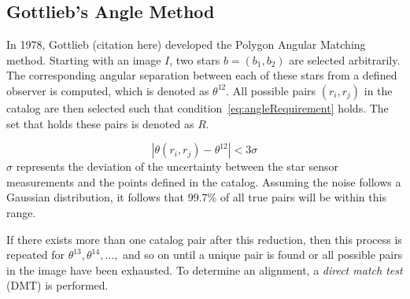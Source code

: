 
\subsection{Gottlieb's Angle Method}\label{subsec:gottlieb'sAngleMethod}
In 1978, Gottlieb (citation here) developed the Polygon Angular Matching method.
Starting with an image $I$, two stars $b = (b_1, b_2)$ are selected arbitrarily.
The corresponding angular separation between each of these stars from a defined observer is computed, which is
denoted as $\theta^{12}$.
All possible pairs $(r_i, r_j)$ in the catalog are then selected such that condition~\eqref{eq:angleRequirement} holds.
The set that holds these pairs is denoted as $R$.

\begin{equation}
    \label{eq:angleRequirement}
    | \theta(r_i, r_j) - \theta^{12} | < 3 \sigma
\end{equation}
$\sigma$ represents the deviation of the uncertainty between the star sensor measurements and the points defined in the
catalog.
Assuming the noise follows a Gaussian distribution, it follows that 99.7\% of all true pairs will be within this range.

If there exists more than one catalog pair after this reduction, then this process is repeated for
$\theta^{13}, \theta^{14}, \dots,$ and so on until a unique pair is found or all possible pairs in the image
have been exhausted.
To determine an alignment, a \textit{direct match test} (DMT) is performed.

